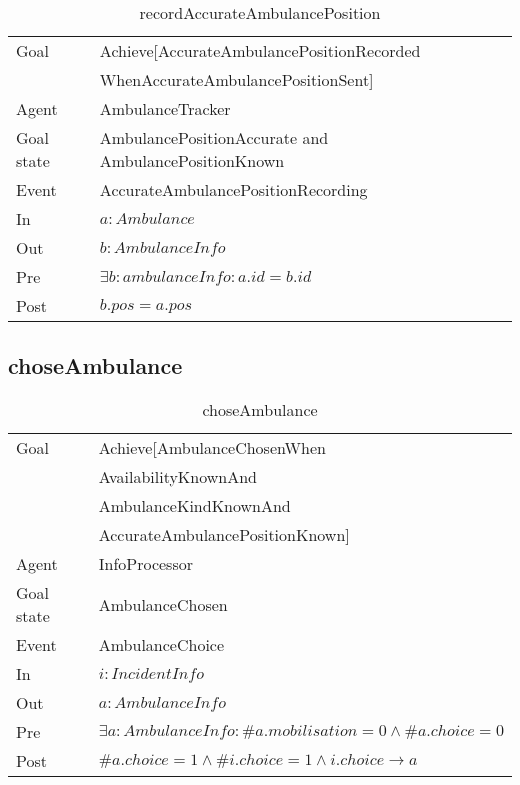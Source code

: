 	\begin{table}[!h] \centering
		\begin{tabularx}{\textwidth}{|l|X|} \hline
			Goal & Achieve[AccurateAmbulancePositionRecorded\\ &WhenAccurateAmbulancePositionSent] \\ \hline
			Agent & AmbulanceTracker \\ \hline
			Goal state & AmbulancePositionAccurate and AmbulancePositionKnown \\ \hline
			Event & AccurateAmbulancePositionRecording \\ \hline
			In & $a: Ambulance$ \\ \hline
			Out & $b: AmbulanceInfo$ \\ \hline
			Pre & $\exists b: ambulanceInfo : a.id = b.id$ \\ \hline
			Post & $b.pos = a.pos$ \\ \hline
		\end{tabularx}
		\caption{recordAccurateAmbulancePosition}
	\end{table}

\subsection{choseAmbulance}
	
	
	\begin{table}[!h] \centering
		\begin{tabularx}{\textwidth}{|l|X|} \hline
			Goal & Achieve[AmbulanceChosenWhen\\ & AvailabilityKnownAnd \\ & AmbulanceKindKnownAnd \\ & AccurateAmbulancePositionKnown] \\ \hline
			Agent & InfoProcessor \\ \hline
			Goal state & AmbulanceChosen \\ \hline
			Event & AmbulanceChoice \\ \hline
			In & $i: IncidentInfo$ \\ \hline
			Out & $a: AmbulanceInfo$ \\ \hline
			Pre & $\exists a: AmbulanceInfo : \#a.mobilisation = 0 \wedge \#a.choice = 0$ \\ \hline
			Post & $\#a.choice = 1 \wedge \#i.choice = 1 \wedge i.choice \rightarrow a$ \\ \hline
		\end{tabularx}
		\caption{choseAmbulance}
	\end{table}

